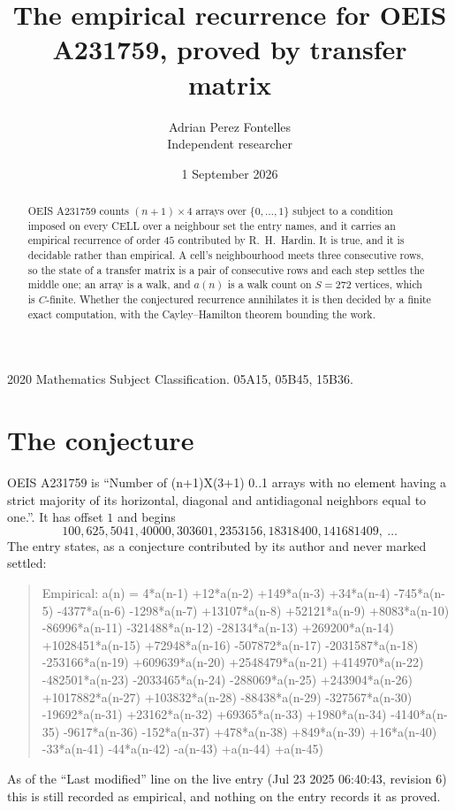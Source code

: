 \documentclass[11pt,a4paper]{article}
\title{The empirical recurrence for OEIS A231759, proved by transfer matrix}
\author{Adrian Perez Fontelles\\ \small Independent researcher}
\date{1 September 2026}
\theoremstyle{plain}
\theoremstyle{definition}
\begin{document}
\maketitle

\begin{abstract}
OEIS A231759 counts $(n+1)\times4$ arrays over $\{0,\dots,1\}$ subject to a condition imposed on
every CELL over a neighbour set the entry names, and it carries an empirical recurrence of
order $45$ contributed by R.~H.~Hardin. It is true, and it is decidable rather than
empirical. A cell's neighbourhood meets three consecutive rows, so the state of a transfer
matrix is a pair of consecutive rows and each step settles the middle one; an array is a
walk, and $a(n)$ is a walk count on $S=272$ vertices, which is $C$-finite. Whether the
conjectured recurrence annihilates it is then decided by a finite exact computation, with the
Cayley--Hamilton theorem bounding the work.
\end{abstract}

\noindent\small 2020 Mathematics Subject Classification. 05A15, 05B45, 15B36.\normalsize

\section{The conjecture}

OEIS A231759 is ``Number of (n+1)X(3+1) 0..1 arrays with no element having a strict majority of its horizontal, diagonal and antidiagonal neighbors equal to one.''. It has offset $1$ and begins
\[
100, 625, 5041, 40000, 303601, 2353156, 18318400, 141681409,\ \dots
\]
The entry states, as a conjecture contributed by its author and never marked settled:
\begin{quote}
Empirical: a(n) = 4*a(n-1) +12*a(n-2) +149*a(n-3) +34*a(n-4) -745*a(n-5) -4377*a(n-6) -1298*a(n-7) +13107*a(n-8) +52121*a(n-9) +8083*a(n-10) -86996*a(n-11) -321488*a(n-12) -28134*a(n-13) +269200*a(n-14) +1028451*a(n-15) +72948*a(n-16) -507872*a(n-17) -2031587*a(n-18) -253166*a(n-19) +609639*a(n-20) +2548479*a(n-21) +414970*a(n-22) -482501*a(n-23) -2033465*a(n-24) -288069*a(n-25) +243904*a(n-26) +1017882*a(n-27) +103832*a(n-28) -88438*a(n-29) -327567*a(n-30) -19692*a(n-31) +23162*a(n-32) +69365*a(n-33) +1980*a(n-34) -4140*a(n-35) -9617*a(n-36) -152*a(n-37) +478*a(n-38) +849*a(n-39) +16*a(n-40) -33*a(n-41) -44*a(n-42) -a(n-43) +a(n-44) +a(n-45)
\end{quote}
As of the ``Last modified'' line on the live entry (Jul 23 2025 06:40:43, revision 6) this is still
recorded as empirical, and nothing on the entry records it as proved.
\end{document}
